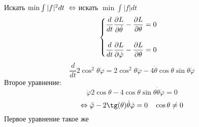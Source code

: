 \documentclass[main]{subfiles}
\begin{document}
\begin{sol}
        Искать $\min \int |f|^2 dt \ \lra \ $искать $\min \int |f| dt$
        \[\begin{cases}
            \dfrac{d}{dt} \dfrac{\partial L}{\partial \dot{\theta}} - \dfrac{\partial L}{\partial \theta} = 0\\ \\
            \dfrac{d}{dt} \dfrac{\partial L}{\partial \dot{\varphi}} - \dfrac{\partial L}{\partial \theta} = 0
        \end{cases}\]
        \[\frac{d}{dt} 2 \cos^2 \theta \dot{\varphi} = 2 \cos^2 \theta \ddot{\varphi} - 4 \dot{\theta} \cos \theta \sin \theta \dot{\varphi}\]
        Второе уравнение:
        \[\ddot{\varphi} 2 \cos \theta - 4 \cos \theta \sin \theta \dot{\theta} \dot{\varphi} = 0\]
        \[\lra \ddot{\varphi} - 2 \tg(\theta) \dot{\theta} \dot{\varphi} = 0 \q \cos \theta \neq 0\]
        Первое уравнение такое же
    \end{sol}
\end{document}
